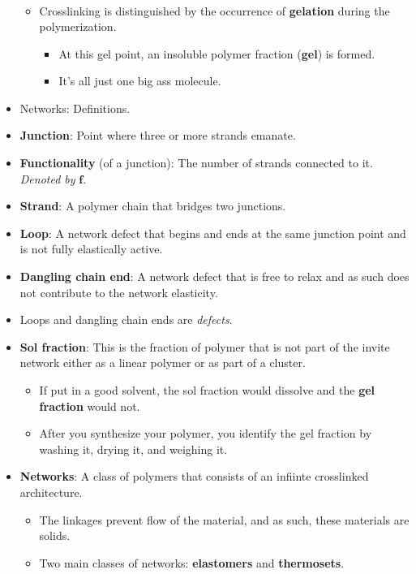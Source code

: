 \documentclass[../notes.tex]{subfiles}
\begin{document}
\begin{itemize}
\begin{itemize}
\begin{align*}
        \end{align*}
        \item Crosslinking is distinguished by the occurrence of \textbf{gelation} during the polymerization.
        \begin{itemize}
            \item At this gel point, an insoluble polymer fraction (\textbf{gel}) is formed.
            \item It's all just one big ass molecule.
        \end{itemize}
    \end{itemize}
    \item Networks: Definitions.
    \item \textbf{Junction}: Point where three or more strands emanate.
    \item \textbf{Functionality} (of a junction): The number of strands connected to it. \emph{Denoted by} $\bm{f}$.
    \item \textbf{Strand}: A polymer chain that bridges two junctions.
    \item \textbf{Loop}: A network defect that begins and ends at the same junction point and is not fully elastically active.
    \item \textbf{Dangling chain end}: A network defect that is free to relax and as such does not contribute to the network elasticity.
    \item Loops and dangling chain ends are \emph{defects}.
    \item \textbf{Sol fraction}: This is the fraction of polymer that is not part of the invite network either as a linear polymer or as part of a cluster.
    \begin{itemize}
        \item If put in a good solvent, the sol fraction would dissolve and the \textbf{gel fraction} would not.
        \item After you synthesize your polymer, you identify the gel fraction by washing it, drying it, and weighing it.
    \end{itemize}
    \item \textbf{Networks}: A class of polymers that consists of an infiinte crosslinked architecture.
    \begin{itemize}
        \item The linkages prevent flow of the material, and as such, these materials are solids.
        \item Two main classes of networks: \textbf{elastomers} and \textbf{thermosets}.

\end{itemize}
\end{itemize}
\end{document}
